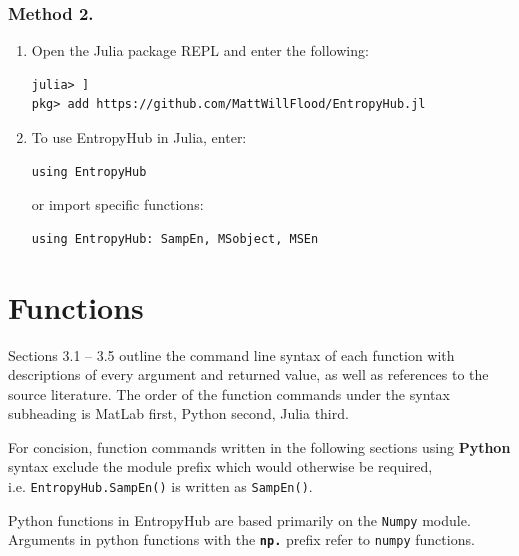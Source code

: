 \documentclass[12pt, a4paper, titlepage, openany]{book}
\newcommand\chapterimage[2][]{%
  \AddToShipoutPictureBG*{%
    \AtTextUpperLeft{%
     \hspace*{\textwidth}%
      \llap{%
            \texttt{[image: \#2]}}}}}%
\begin{document}
\subsection*{\normalsize Method 2.}
\begin{enumerate}
\item  Open the Julia package REPL and enter the following:
\begin{verbatim}
julia> ]
pkg> add https://github.com/MattWillFlood/EntropyHub.jl
\end{verbatim}
\item To use EntropyHub in Julia, enter:
\begin{verbatim}
using EntropyHub
\end{verbatim}
or import specific functions:
\begin{verbatim}
using EntropyHub: SampEn, MSobject, MSEn
\end{verbatim}
\end{enumerate}


\newpage
\chapter{\textbf{Functions}}
\chapterimage[width=16cm, height=3cm]{Chapter Banner2.png}
\vspace{55mm}

Sections 3.1 – 3.5 outline the command line syntax of each function with descriptions of every argument and returned value, as well as references to the source literature. The order of the function commands under the syntax subheading is MatLab first, Python second, Julia third. 

\begin{tcolorbox}[sharp corners, colback=ehone!30, colframe=ehone, title=\textbf{NOTE}]
For concision, function commands written in the following sections using \textbf{Python} syntax exclude the module prefix which would otherwise be required,\\ i.e. \texttt{EntropyHub.SampEn()} is written as \texttt{SampEn()}. 
\end{tcolorbox}

\begin{tcolorbox}[sharp corners, colback=ehone!30, colframe=ehone, title=\textbf{NOTE}]
Python functions in EntropyHub are based primarily on the \texttt{Numpy} module.\\ Arguments in python functions with the \textbf{\texttt{np.}} prefix refer to \texttt{numpy} functions.  
\end{tcolorbox}
\end{document}
